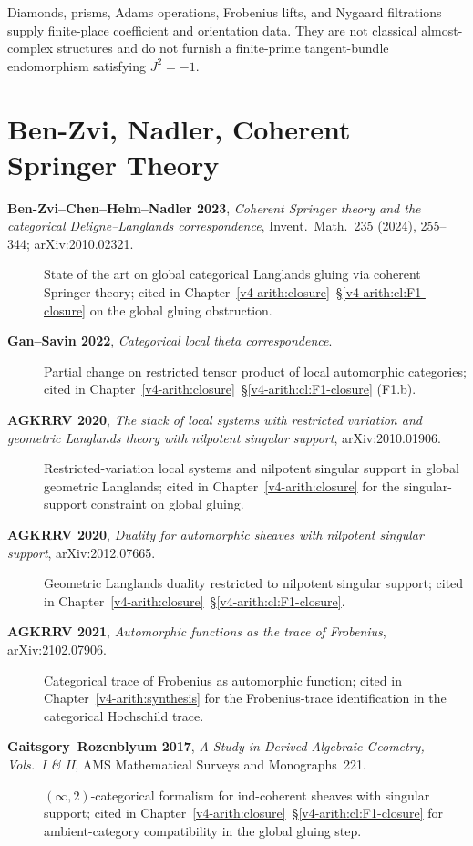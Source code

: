 Diamonds, prisms, Adams operations, Frobenius lifts, and Nygaard
filtrations supply finite-place coefficient and orientation data.
They are not classical almost-complex structures and do not furnish a
finite-prime tangent-bundle endomorphism satisfying \(J^{2}=-1\).

\section{Ben-Zvi, Nadler, Coherent Springer Theory}
\label{v4-arith:app:A:BZN-coherent-Springer}

\begin{description}
\item[\textbf{Ben-Zvi--Chen--Helm--Nadler 2023}, \emph{Coherent
Springer theory and the categorical Deligne--Langlands
correspondence}, Invent.~Math.~235 (2024), 255--344;
arXiv:2010.02321.] State of the art on global categorical
Langlands gluing via coherent Springer theory; cited in
Chapter~\ref{v4-arith:closure}~\S\ref{v4-arith:cl:F1-closure}
on the global gluing obstruction.
\item[\textbf{Gan--Savin 2022}, \emph{Categorical local theta
correspondence}.] Partial change on restricted
tensor product of local automorphic categories; cited in
Chapter~\ref{v4-arith:closure}~\S\ref{v4-arith:cl:F1-closure} (F1.b).
\item[\textbf{AGKRRV 2020}, \emph{The stack of local systems with
restricted variation and geometric Langlands theory with nilpotent
singular support}, arXiv:2010.01906.] Restricted-variation local
systems and nilpotent singular support in global geometric Langlands;
cited in Chapter~\ref{v4-arith:closure} for the singular-support
constraint on global gluing.
\item[\textbf{AGKRRV 2020}, \emph{Duality for automorphic sheaves
with nilpotent singular support}, arXiv:2012.07665.] Geometric
Langlands duality restricted to nilpotent singular support; cited
in Chapter~\ref{v4-arith:closure}~\S\ref{v4-arith:cl:F1-closure}.
\item[\textbf{AGKRRV 2021}, \emph{Automorphic functions as the trace
of Frobenius}, arXiv:2102.07906.] Categorical trace of Frobenius
as automorphic function; cited in
Chapter~\ref{v4-arith:synthesis} for the Frobenius-trace
identification in the categorical Hochschild trace.
\item[\textbf{Gaitsgory--Rozenblyum 2017}, \emph{A Study in Derived
Algebraic Geometry, Vols.~I \& II}, AMS Mathematical Surveys and
Monographs~221.]
\((\infty,2)\)-categorical formalism for ind-coherent sheaves
with singular support; cited in
Chapter~\ref{v4-arith:closure}~\S\ref{v4-arith:cl:F1-closure}
for ambient-category compatibility in the global gluing step.
\end{description}

